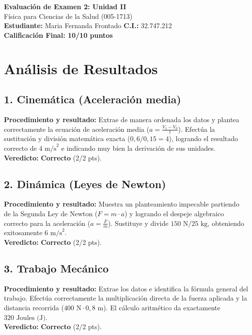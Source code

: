 \documentclass[12pt,letterpaper]{article}
\begin{document}
\begin{center}
    \Large \textbf{Evaluación de Examen 2: Unidad II} \\
    \large Física para Ciencias de la Salud (005-1713) \\
    \vspace{0.5cm}
    \textbf{Estudiante:} Maria Fernanda Frontado \quad \textbf{C.I.:} 32.747.212
    \vspace{0.3cm} \\
    \large \textbf{Calificación Final: 10/10 puntos}
\end{center}

\vspace{0.5cm}

\section*{Análisis de Resultados}

\subsection*{1. Cinemática (Aceleración media)}
\textbf{Procedimiento y resultado:} Extrae de manera ordenada los datos y plantea correctamente la ecuación de aceleración media ($a = \frac{V_1 - V_0}{t}$). Efectúa la sustitución y división matemática exacta ($0,6 / 0,15 = 4$), logrando el resultado correcto de $4 \text{ m/s}^2$ e indicando muy bien la derivación de sus unidades. \\
\textbf{Veredicto:} \textbf{Correcto} (2/2 pts).

\subsection*{2. Dinámica (Leyes de Newton)}
\textbf{Procedimiento y resultado:} Muestra un planteamiento impecable partiendo de la Segunda Ley de Newton ($F = m \cdot a$) y logrando el despeje algebraico correcto para la aceleración ($a = \frac{F}{m}$). Sustituye y divide $150 \text{ N} / 25 \text{ kg}$, obteniendo exitosamente $6 \text{ m/s}^2$. \\
\textbf{Veredicto:} \textbf{Correcto} (2/2 pts).

\subsection*{3. Trabajo Mecánico}
\textbf{Procedimiento y resultado:} Extrae los datos e identifica la fórmula general del trabajo. Efectúa correctamente la multiplicación directa de la fuerza aplicada y la distancia recorrida ($400 \text{ N} \cdot 0,8 \text{ m}$). El cálculo aritmético da exactamente $320 \text{ Joules (J)}$. \\
\textbf{Veredicto:} \textbf{Correcto} (2/2 pts).
\end{document}
